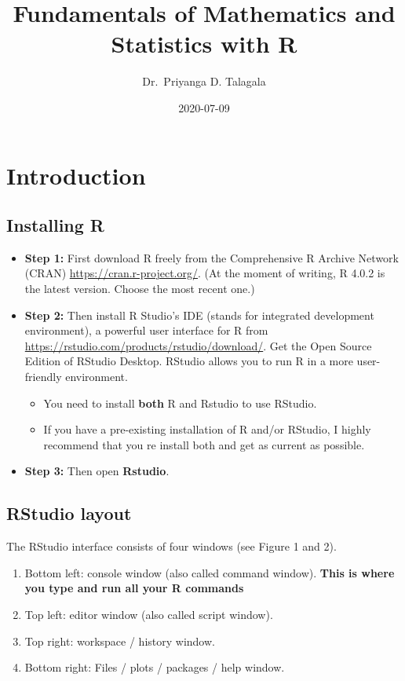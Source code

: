 \documentclass[]{book}
\title{Fundamentals of Mathematics and Statistics with R}
\author{Dr.~Priyanga D. Talagala}
\date{2020-07-09}
\begin{document}
\maketitle

{
\setcounter{tocdepth}{1}
\tableofcontents
}
\hypertarget{intro}{%
\chapter{Introduction}\label{intro}}

\hypertarget{installing-r}{%
\section{Installing R}\label{installing-r}}

\begin{itemize}
\item
  \textbf{Step 1:} First download R freely from the Comprehensive R Archive Network (CRAN) \url{https://cran.r-project.org/}.
  (At the moment of writing, R 4.0.2 is the latest version. Choose the most recent one.)
\item
  \textbf{Step 2:} Then install R Studio's IDE (stands for integrated development environment), a powerful user interface for R from \url{https://rstudio.com/products/rstudio/download/}. Get the Open Source Edition of RStudio Desktop. RStudio allows you to run R in a more user-friendly environment.

  \begin{itemize}
  \item
    You need to install \textbf{both} R and Rstudio to use RStudio.
  \item
    If you have a pre-existing installation of R and/or RStudio, I highly recommend that you re install both and get as current as possible.
  \end{itemize}
\item
  \textbf{Step 3:} Then open \textbf{Rstudio}.
\end{itemize}

\hypertarget{rstudio-layout}{%
\section{RStudio layout}\label{rstudio-layout}}

The RStudio interface consists of four windows (see Figure 1 and 2).

\begin{enumerate}
\def\labelenumi{\arabic{enumi}.}
\item
  Bottom left: console window (also called command window). \textbf{This is where you type and run all your R commands}
\item
  Top left: editor window (also called script window).
\item
  Top right: workspace / history window.
\item
  Bottom right: Files / plots / packages / help window.
\end{enumerate}
\end{document}
